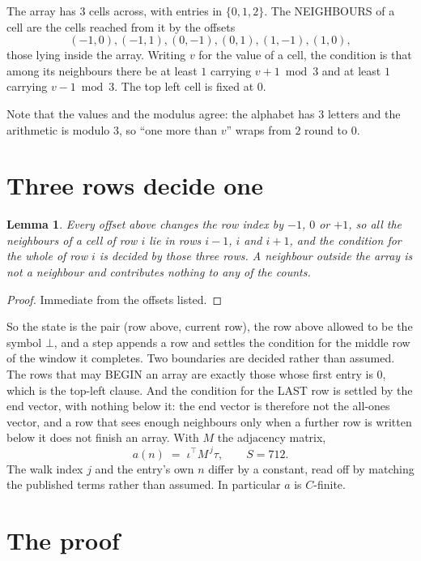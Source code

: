 \documentclass[11pt,a4paper]{article}
\theoremstyle{plain}
\newtheorem{lemma}[theorem]{Lemma}
\theoremstyle{definition}
\begin{document}
The array has $3$ cells across, with entries in $\{0,1,2\}$. The NEIGHBOURS of a cell are the
cells reached from it by the offsets
\[
(-1,0), (-1,1), (0,-1), (0,1), (1,-1), (1,0),
\]
those lying inside the array. Writing $v$ for the value of a cell, the condition is that among
its neighbours there be at least $1$ carrying $v+1 \bmod 3$ and at least $1$ carrying $v-1 \bmod 3$. The top left
cell is fixed at $0$.

Note that the values and the modulus agree: the alphabet has $3$ letters and the arithmetic
is modulo $3$, so ``one more than $v$'' wraps from $2$ round to $0$.

\section{Three rows decide one}

\begin{lemma}\label{lem:win}
Every offset above changes the row index by $-1$, $0$ or $+1$, so all the neighbours of a cell
of row $i$ lie in rows $i-1$, $i$ and $i+1$, and the condition for the whole of row $i$ is
decided by those three rows. A neighbour outside the array is not a neighbour and contributes
nothing to any of the counts.
\end{lemma}

\begin{proof}
Immediate from the offsets listed.
\end{proof}

So the state is the pair (row above, current row), the row above allowed to be the symbol
$\bot$, and a step appends a row and settles the condition for the middle row of the window it
completes. Two boundaries are decided rather than assumed. The rows that may BEGIN an array are
exactly those whose first entry is $0$, which is the top-left clause. And the condition for the
LAST row is settled by the end vector, with nothing below it: the end vector is therefore not
the all-ones vector, and a row that sees enough neighbours only when a further row is written
below it does not finish an array. With $M$ the adjacency matrix,
\[
a(n)\;=\;\iota^{\!\top}M^{\,j}\tau ,\qquad S=712.
\]
The walk index $j$ and the entry's own $n$ differ by a constant, read off by matching the
published terms rather than assumed. In particular $a$ is $C$-finite.

\section{The proof}
\end{document}
